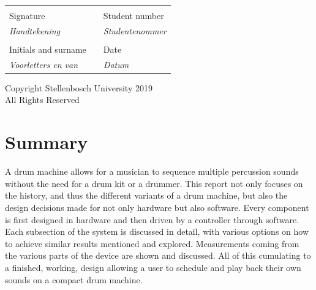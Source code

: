 \documentclass[12pt,a4paper]{report}
\begin{document}
\begin{table}[ht]
	\begin{center}
		\begin{tabular*}{15.5cm}{@{\extracolsep{\fill}}lll}
			\makebox[8cm]{\hrulefill} & & \makebox[6cm]{\hrulefill}\\
			Signature & & Student number \\
			\textit{Handtekening} & & \textit{Studentenommer} \\[1cm]
		    \makebox[8cm]{\hrulefill} & & \makebox[6cm]{\hrulefill}\\ 
			Initials and surname & & Date \\
			\textit{Voorletters en van} & & \textit{Datum}\\
		\end{tabular*}
	\end{center}
\end{table}

\vfill

\begin{center}
	Copyright \textcopyright \space Stellenbosch University 2019\\
	All Rights Reserved
\end{center}

\newpage

\section*{Summary}
A drum machine allows for a musician to sequence multiple percussion sounds without the need for a drum kit or a drummer. This report not only focuses on the history, and thus the different variants of a drum machine, but also the design decisions made for not only hardware but also software. Every component is first designed in hardware and then driven by a controller through software. Each subsection of the system is discussed in detail, with various options on how to achieve similar results mentioned and explored. Measurements coming from the various parts of the device are shown and discussed. All of this cumulating to a finished, working, design allowing a user to schedule and play back their own sounds on a compact drum machine. 
\end{document}
